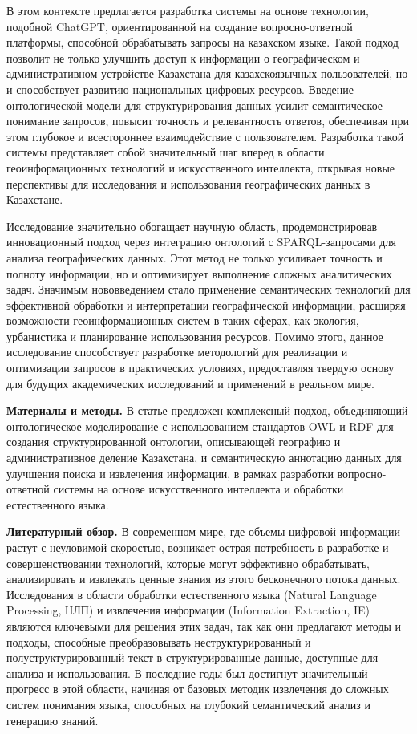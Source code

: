 В этом контексте предлагается разработка системы на основе технологии,
подобной ChatGPT, ориентированной на создание вопросно-ответной
платформы, способной обрабатывать запросы на казахском языке. Такой
подход позволит не только улучшить доступ к информации о географическом
и административном устройстве Казахстана для казахскоязычных
пользователей, но и способствует развитию национальных цифровых
ресурсов. Введение онтологической модели для структурирования данных
усилит семантическое понимание запросов, повысит точность и
релевантность ответов, обеспечивая при этом глубокое и всестороннее
взаимодействие с пользователем. Разработка такой системы представляет
собой значительный шаг вперед в области геоинформационных технологий и
искусственного интеллекта, открывая новые перспективы для исследования и
использования географических данных в Казахстане.

Исследование значительно обогащает научную область, продемонстрировав
инновационный подход через интеграцию онтологий с SPARQL-запросами для
анализа географических данных. Этот метод не только усиливает точность и
полноту информации, но и оптимизирует выполнение сложных аналитических
задач. Значимым нововведением стало применение семантических технологий
для эффективной обработки и интерпретации географической информации,
расширяя возможности геоинформационных систем в таких сферах, как
экология, урбанистика и планирование использования ресурсов. Помимо
этого, данное исследование способствует разработке методологий для
реализации и оптимизации запросов в практических условиях, предоставляя
твердую основу для будущих академических исследований и применений в
реальном мире.

\textbf{Материалы и методы.} В статье предложен комплексный подход,
объединяющий онтологическое моделирование с использованием стандартов
OWL и RDF для создания структурированной онтологии, описывающей
географию и административное деление Казахстана, и семантическую
аннотацию данных для улучшения поиска и извлечения информации, в рамках
разработки вопросно-ответной системы на основе искусственного интеллекта
и обработки естественного языка.

\textbf{Литературный обзор.} В современном мире, где объемы цифровой
информации растут с неуловимой скоростью, возникает острая потребность в
разработке и совершенствовании технологий, которые могут эффективно
обрабатывать, анализировать и извлекать ценные знания из этого
бесконечного потока данных. Исследования в области обработки
естественного языка (Natural Language Processing, НЛП) и извлечения
информации (Information Extraction, IE) являются ключевыми для решения
этих задач, так как они предлагают методы и подходы, способные
преобразовывать неструктурированный и полуструктурированный текст в
структурированные данные, доступные для анализа и использования. В
последние годы был достигнут значительный прогресс в этой области,
начиная от базовых методик извлечения до сложных систем понимания языка,
способных на глубокий семантический анализ и генерацию знаний.


